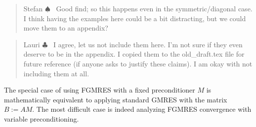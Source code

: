 \documentclass{siamart251216}
\newenvironment{lauri}{\begin{quote}\color{brilliantrose} \small\sf Lauri $\clubsuit$~}{\end{quote}}
\newenvironment{stefan}{\begin{quote}\color{amethyst} \small\sf Stefan $\spadesuit$~}{\end{quote}}
\begin{document}
\begin{stefan}
    Good find; so this happens even in the symmetric/diagonal case. I think having the examples here could be a bit distracting, but we could move them to an appendix?
\end{stefan}
\begin{lauri}
    I agree, let us not include them here. I'm not sure if they even deserve to be in the appendix. I copied them to the old\_draft.tex file for future reference (if anyone asks to justify these claims). I am okay with not including them at all.
\end{lauri}
\fi

The special case of using FGMRES with a fixed preconditioner $M$ is mathematically equivalent to applying standard GMRES with the matrix $B:=A M$. The most difficult case is indeed analyzing FGMRES convergence with variable preconditioning.

    
\end{document}
